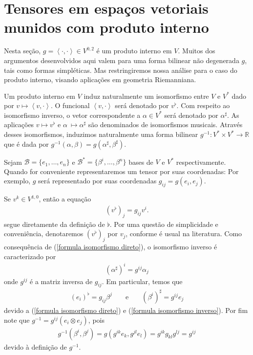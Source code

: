 \documentclass[10pt,reqno]{amsart}
\begin{document}
\section{Tensores em espaços vetoriais munidos com produto interno}

Nesta seção, $g =\left< \cdot, \cdot \right> \in V^{0,2}$ é um produto interno em $V$.
Muitos dos argumentos desenvolvidos aqui valem para uma forma bilinear não degenerada $g$, tais como formas simpléticas.
Mas restringiremos nossa análise para o caso do produto interno, visando aplicações em geometria Riemanniana.

Um produto interno em $V$ induz naturalmente um isomorfismo entre $V$ e $V^\ast$ dado por $v \mapsto \left< v, \cdot \right>$. 
O funcional $\left< v, \cdot \right>$ será denotado por $v^\flat$. 
Com respeito ao isomorfismo inverso, o vetor correspondente a $\alpha \in V^\ast$ será denotado por $\alpha^\sharp$.
As aplicações $v \mapsto v^\flat$ e $\alpha\ \mapsto \alpha^\sharp$ são denominados de isomorfismos musicais.
Através desses isomorfismos, induzimos naturalmente uma forma bilinear $g^{-1}:V^\ast \times V^\ast \rightarrow \mathbb R$ que é dada por $g^{-1}(\alpha,\beta) = g(\alpha^\sharp, \beta^\sharp)$.

Sejam $\mathcal B = \{e_1, \ldots, e_n\}$ e $\mathcal B^\ast = \{\beta^i, \ldots, \beta^n \}$ bases de $V$ e $V^\ast$ respectivamente.
Quando for conveniente representaremos um tensor por suas coordenadas: 
Por exemplo, $g$ será representado por suas coordenadas $g_{ij} = g(e_i,e_j)$. 

Se $v^k \in V^{1,0}$, então a equação
\begin{align}
\label{formula isomorfismo direto}
(v^\flat)_j = g_{ij}v^i.
\end{align} 
segue diretamente da definição de $\flat$.
Por uma questão de simplicidade e conveniência, denotaremos $(v^\flat)_j$ por $v_j$, conforme é usual na literatura.
Como consequência de (\ref{formula isomorfismo direto}), o isomorfismo inverso é caracterizado por
\begin{align}
\label{formula isomorfismo inverso}
(\alpha^\sharp)^i=g^{ij}\alpha_j
\end{align}
onde $g^{ij}$ é a matriz inversa de $g_{ij}$.
Em particular, temos que
\begin{align}
\label{mudanca de base para dual}
& (e_i)^\flat = g_{ij}\beta^j & & \text{ e } & & (\beta^i)^\sharp = g^{ij}e_j &
\end{align}
devido a (\ref{formula isomorfismo direto}) e (\ref{formula isomorfismo inverso}).
Por fim note que $g^{-1}=g^{ij}(e_i \otimes e_j)$, pois
\begin{align*}
g^{-1}(\beta^i,\beta^j) = g(g^{ik}e_k, g^{jl} e_l) = g^{ik} g_{kl} g^{lj} = g^{ij} 
\end{align*}
devido à definição de $g^{-1}$.
\end{document}
